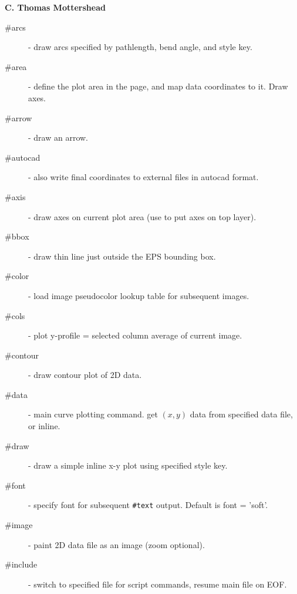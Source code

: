 \documentclass[11pt]{article} %
\newcommand{\vb}{\verb ;}
\begin{document}
\begin{center}  {\bf C. Thomas Mottershead }
\begin{description}
  \item[\#arcs] - draw arcs specified by pathlength, bend angle, and style key.                                                 
  \item[\#area]  - define the plot area in  the page, and map data coordinates to it. Draw axes.              
  \item[\#arrow] - draw an arrow.                                                                                               
  \item[\#autocad] - also write final coordinates to external files in {\sc autocad} format.                                    
  \item[\#axis] - draw axes on current plot area (use to put axes on top layer).                                                
  \item[\#bbox]  - draw thin line just outside the EPS bounding box.                                                            
  \item[\#color] - load image pseudocolor lookup table for subsequent images.                                                   
  \item[\#cols] - plot y-profile = selected column average of current image.                                                    
  \item[\#contour] - draw contour plot of 2D data.                                                                              
  \item[\#data] - main curve plotting command. get $(x,y)$ data from specified data file, or inline.                                
  \item[\#draw] - draw a simple inline x-y  plot using specified style key.                                                     
  \item[\#font]   - specify font for subsequent \vb#text; output. Default is font = 'soft'.                                     
  \item[\#image] - paint 2D data file as an image (zoom optional).                                                              
  \item[\#include]  - switch to specified file for script commands, resume main file on EOF.                  

\end{description}
\end{center}
\end{document}

